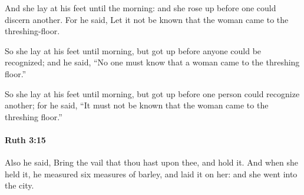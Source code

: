 			\begin{versebox}
					\item[BHS] 
					\item[LXX] 
					\item[ASV] And she lay at his feet until the morning: and she rose up before one could discern another. For he said, Let it not be known that the woman came to the threshing-floor.
					\item[NIV] So she lay at his feet until morning, but got up before anyone could be recognized; and he said, “No one must know that a woman came to the threshing floor.”
					\item[NRSV] So she lay at his feet until morning, but got up before one person could recognize another; for he said, “It must not be known that the woman came to the threshing floor.”
			\end{versebox}

		\paragraph{Ruth 3:15} %
			\label{RUTH-3-15}

			Also he said, Bring the vail that thou hast upon thee, and hold it. And when she held it, he measured six measures of barley, and laid it on her: and she went into the city.

